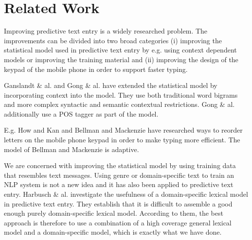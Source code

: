 \documentclass[a4paper,conference]{IEEEtran}
\begin{document}

\section{Related Work}
\label{sec:related-work}

Improving predictive text entry is a widely researched problem. The
improvements can be divided into two broad categories (i) improving
the statistical model used in predictive text entry by e.g. using
context dependent models or improving the training material and (ii)
improving the design of the keypad of the mobile phone in order to
support faster typing.

Ganslandt \& al. \cite{ganslandt/2009} and Gong \&
al. \cite{gong/2008} have extended the statistical model by
incorporating context into the model. They use both traditional word
bigrams and more complex syntactic and semantic contextual
restrictions. Gong \& al. additionally use a POS tagger as part of the
model.

E.g. How and Kan \cite{how05optimizing} and Bellman and Mackenzie
\cite{Department98aprobabilistic} have researched ways to reorder
letters on the mobile phone keypad in order to make typing more
efficient. The model of Bellman and Mackenzie is adaptive.

We are concerned with improving the statistical model by using
training data that resembles text messages. Using genre or
domain-specific text to train an NLP system is not a new idea and it
has also been applied to predictive text entry. Harbusch \&
al. \cite{Harbusch/2003} investigate the usefulness of a
domain-specific lexical model in predictive text entry. They establish
that it is difficult to assemble a good enough purely domain-specific
lexical model. According to them, the best approach is therefore to use a
combination of a high coverage general lexical model and a domain-specific
model, which is exactly what we have done.
\end{document}
